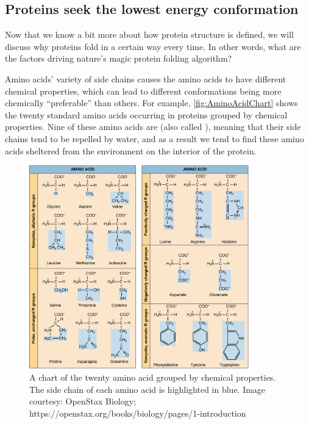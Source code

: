 \subsection{Proteins seek the lowest energy conformation}

Now that we know a bit more about how protein structure is defined, we will discuss why proteins fold in a certain way every time. In other words, what are the factors driving nature's magic protein folding algorithm?

Amino acids' variety of side chains causes the amino acids to have different chemical properties, which can lead to different conformations being more chemically ``preferable'' than others. For example, \autoref{fig:AminoAcidChart} shows the twenty standard amino acids occurring in proteins grouped by chemical properties. Nine of these amino acids are  (also called ), meaning that their side chains tend to be repelled by water, and as a result we tend to find these amino acids sheltered from the environment on the interior of the protein.

\begin{figure}[h]
	\centering
	\mySfFamily
	\includegraphics[width = 0.85\textwidth]{../images/AminoAcidChart.png}
	\caption{A chart of the twenty amino acid grouped by chemical properties. The side chain of each amino acid is highlighted in blue. Image courtesy: OpenStax Biology; https://openstax.org/books/biology/pages/1-introduction}
	\label{fig:AminoAcidChart}
\end{figure}

